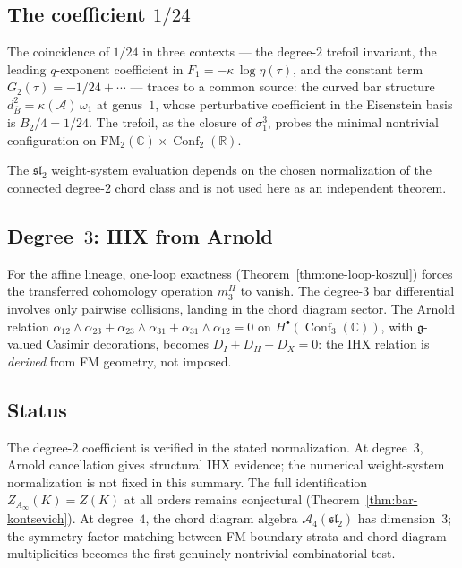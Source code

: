 \documentclass[11pt]{article}
\newcommand{\cA}{\mathcal{A}}
\newcommand{\fg}{\mathfrak{g}}
\newcommand{\fsl}{\mathfrak{sl}}
\newcommand{\barB}{\overline{B}}
\newcommand{\C}{\mathbb{C}}
\newcommand{\R}{\mathbb{R}}
\newcommand{\FM}{\mathrm{FM}}
\DeclareMathOperator{\Conf}{Conf}
\begin{document}
\subsection*{The coefficient $1/24$}

The coincidence of $1/24$ in three contexts --- the degree-$2$
trefoil invariant, the leading $q$-exponent coefficient in
$F_1=-\kappa\,\log\eta(\tau)$, and the constant term
$G_2(\tau) = -1/24 + \cdots$ --- traces to a common source:
the curved bar structure $d_{\barB}^2 = \kappa(\cA)\,\omega_1$
at genus~$1$, whose perturbative coefficient in the Eisenstein
basis is $B_2/4 = 1/24$.  The trefoil, as the closure of
$\sigma_1^3$, probes the minimal nontrivial configuration on
$\FM_2(\C) \times \Conf_2(\R)$.

The $\fsl_2$ weight-system evaluation depends on the chosen
normalization of the connected degree-$2$ chord class and is not
used here as an independent theorem.

\subsection*{Degree~$3$: IHX from Arnold}

For the affine lineage, one-loop exactness
(Theorem~\ref{thm:one-loop-koszul}) forces the transferred
cohomology operation $m_3^H$ to vanish.
The degree-$3$ bar differential involves only pairwise
collisions, landing in the chord diagram sector.  The Arnold
relation
$\alpha_{12} \wedge \alpha_{23} + \alpha_{23} \wedge
\alpha_{31} + \alpha_{31} \wedge \alpha_{12} = 0$
on $H^\bullet(\Conf_3(\C))$, with $\fg$-valued Casimir
decorations, becomes $D_I + D_H - D_X = 0$: the IHX
relation is \emph{derived} from FM geometry, not imposed.

\subsection*{Status}

The degree-$2$ coefficient is verified in the stated normalization.
At degree~$3$, Arnold cancellation gives structural IHX evidence;
the numerical weight-system normalization is not fixed in this
summary.  The full identification $Z_{A_\infty}(K)=Z(K)$ at all
orders remains conjectural (Theorem~\ref{thm:bar-kontsevich}).
At degree~$4$, the chord
diagram algebra $\cA_4(\fsl_2)$ has dimension~$3$; the symmetry
factor matching between FM boundary strata and chord diagram
multiplicities becomes the first genuinely nontrivial
combinatorial test.
\end{document}
